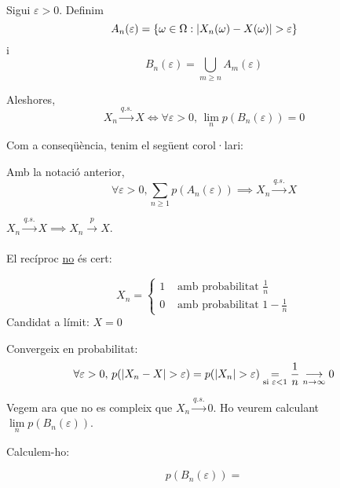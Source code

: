 \begin{lema}
  \-\\
  Sigui $\varepsilon > 0$. Definim $$A_n(\varepsilon) = \left\{\omega \in \Omega : \left\vert X_n(\omega) - X(\omega) \right\vert > \varepsilon\right\}$$ i $$B_n(\varepsilon) = \bigcup_{m\geq n} A_m(\varepsilon)$$
  
  Aleshores,
  \[
    X_n \overset{q.s.}{\to} X \iff \forall \varepsilon > 0, \, \lim_n p(B_n(\varepsilon)) = 0
  \]
\end{lema}

Com a conseqüència, tenim el següent corol·lari:

\begin{col}
  Amb la notació anterior, 
  \[
    \forall \varepsilon > 0, \sum_{n\geq 1}p(A_n(\varepsilon)) \implies X_n \overset{q.s.}{\to} X
  \]
\end{col}

\newpage

\begin{prop}[(IV)]
  $X_n \overset{q.s.}{\to} X \implies X_n \overset{p}{\to} X$. \\\\
  
  El recíproc \underline{no} és cert:
  
  \[
    X_n = \begin{cases}
      1 &\text{ amb probabilitat } \frac{1}{n}\\
      0 &\text{ amb probabilitat } 1 - \frac{1}{n}
    \end{cases}
  \]
  Candidat a límit: $X=0$
  
  Convergeix en probabilitat: 
  $$\forall \varepsilon > 0, \, p(\left\vert X_n - X \right\vert > \varepsilon) = p(\left\vert X_n \right\vert>\varepsilon) \underset{\text{si } \varepsilon < 1}{=} \frac{1}{n} \underset{n \to \infty}{\longrightarrow} 0$$
  
  Vegem ara que no es compleix que $X_n \overset{q.s.}{\to} 0$. Ho veurem calculant $\lim\limits_{n} p(B_n(\varepsilon))$.
  
  Calculem-ho:
  
  \[
    p(B_n(\varepsilon)) = 
  \]
\end{prop}
